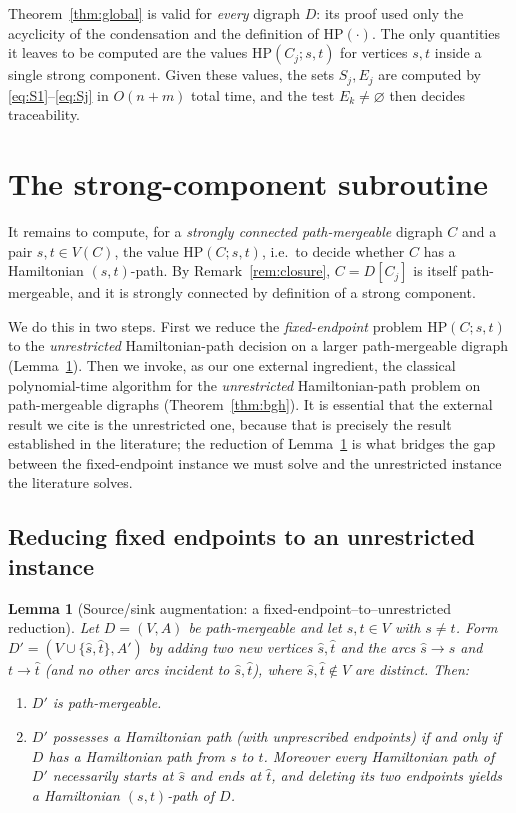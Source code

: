 \documentclass[12pt]{article}
\newtheorem{lemma}{Lemma}
\theoremstyle{definition}
\newcommand{\Vv}{V}
\newcommand{\Aa}{A}
\begin{document}
Theorem~\ref{thm:global} is valid for \emph{every} digraph $D$: its proof used
only the acyclicity of the condensation and the definition of
$\mathrm{HP}(\cdot)$. The only quantities it leaves to be computed are the values
$\mathrm{HP}(C_{j};s,t)$ for vertices $s,t$ inside a single strong component.
Given these values, the sets $S_{j},E_{j}$ are computed by
\eqref{eq:S1}--\eqref{eq:Sj} in $O(n+m)$ total time, and the test
$E_{k}\neq\varnothing$ then decides traceability.

\section{The strong-component subroutine}\label{sec:component}

It remains to compute, for a \emph{strongly connected path-mergeable} digraph $C$
and a pair $s,t\in V(C)$, the value $\mathrm{HP}(C;s,t)$, i.e.\ to decide whether
$C$ has a Hamiltonian $(s,t)$-path. By Remark~\ref{rem:closure}, $C=D[C_{j}]$ is
itself path-mergeable, and it is strongly connected by definition of a strong
component.

We do this in two steps. First we reduce the \emph{fixed-endpoint} problem
$\mathrm{HP}(C;s,t)$ to the \emph{unrestricted} Hamiltonian-path decision on a
larger path-mergeable digraph (Lemma~\ref{lem:source}). Then we invoke, as our one
external ingredient, the classical polynomial-time algorithm for the
\emph{unrestricted} Hamiltonian-path problem on path-mergeable digraphs
(Theorem~\ref{thm:bgh}). It is essential that the external result we cite is the
unrestricted one, because that is precisely the result established in the
literature; the reduction of Lemma~\ref{lem:source} is what bridges the gap
between the fixed-endpoint instance we must solve and the unrestricted instance the
literature solves.

\subsection{Reducing fixed endpoints to an unrestricted instance}\label{sec:selfcontained}

\begin{lemma}[Source/sink augmentation: a fixed-endpoint--to--unrestricted reduction]\label{lem:source}
Let $D=(\Vv,\Aa)$ be path-mergeable and let $s,t\in\Vv$ with $s\neq t$. Form
$D'=(\Vv\cup\{\hat s,\hat t\},\Aa')$ by adding two new vertices $\hat s,\hat t$ and
the arcs $\hat s\to s$ and $t\to\hat t$ (and no other arcs incident to
$\hat s,\hat t$), where $\hat s,\hat t\notin\Vv$ are distinct. Then:
\begin{enumerate}
\item $D'$ is path-mergeable.
\item $D'$ possesses a Hamiltonian path \emph{(with unprescribed endpoints)} if and
only if $D$ has a Hamiltonian path from $s$ to $t$. Moreover every Hamiltonian
path of $D'$ necessarily starts at $\hat s$ and ends at $\hat t$, and deleting its
two endpoints yields a Hamiltonian $(s,t)$-path of $D$.
\end{enumerate}
\end{lemma}
\end{document}
